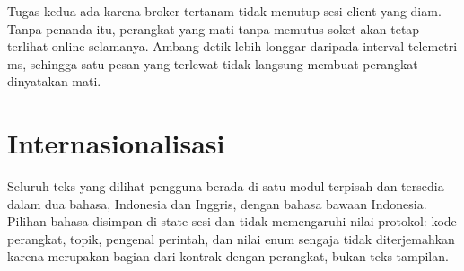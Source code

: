Tugas kedua ada karena broker tertanam tidak menutup sesi client yang diam. Tanpa
penanda itu, perangkat yang mati tanpa memutus soket akan tetap terlihat online
selamanya. Ambang \OfflineS{} detik lebih longgar daripada interval telemetri
\TelemetryMs{} ms, sehingga satu pesan yang terlewat tidak langsung membuat
perangkat dinyatakan mati.

\section{Internasionalisasi}

Seluruh teks yang dilihat pengguna berada di satu modul terpisah dan tersedia dalam
dua bahasa, Indonesia dan Inggris, dengan bahasa bawaan Indonesia. Pilihan bahasa
disimpan di state sesi dan tidak memengaruhi nilai protokol: kode perangkat, topik,
pengenal perintah, dan nilai enum sengaja tidak diterjemahkan karena merupakan
bagian dari kontrak dengan perangkat, bukan teks tampilan.
